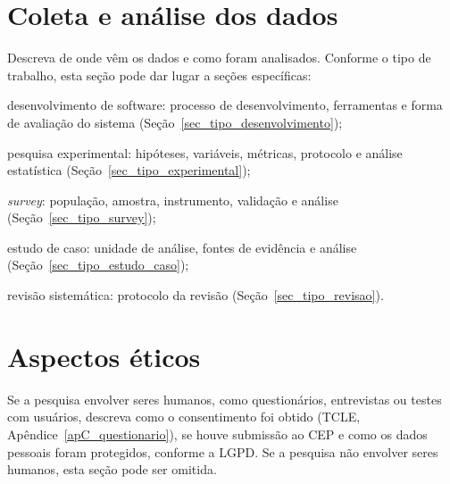 \section{Coleta e análise dos dados}
\label{sec_met_coleta}

Descreva de onde vêm os dados e como foram analisados. Conforme o tipo de trabalho, esta seção pode dar lugar a seções específicas:

\begin{alineas}
	\item desenvolvimento de software: processo de desenvolvimento, ferramentas e forma de avaliação do sistema (Seção~\ref{sec_tipo_desenvolvimento});
	\item pesquisa experimental: hipóteses, variáveis, métricas, protocolo e análise estatística (Seção~\ref{sec_tipo_experimental});
	\item \textit{survey}: população, amostra, instrumento, validação e análise (Seção~\ref{sec_tipo_survey});
	\item estudo de caso: unidade de análise, fontes de evidência e análise (Seção~\ref{sec_tipo_estudo_caso});
	\item revisão sistemática: protocolo da revisão (Seção~\ref{sec_tipo_revisao}).
\end{alineas}

\section{Aspectos éticos}
\label{sec_met_etica}

Se a pesquisa envolver seres humanos, como questionários, entrevistas ou testes com usuários, descreva como o consentimento foi obtido (TCLE, Apêndice~\ref{apC_questionario}), se houve submissão ao CEP e como os dados pessoais foram protegidos, conforme a LGPD. Se a pesquisa não envolver seres humanos, esta seção pode ser omitida.
